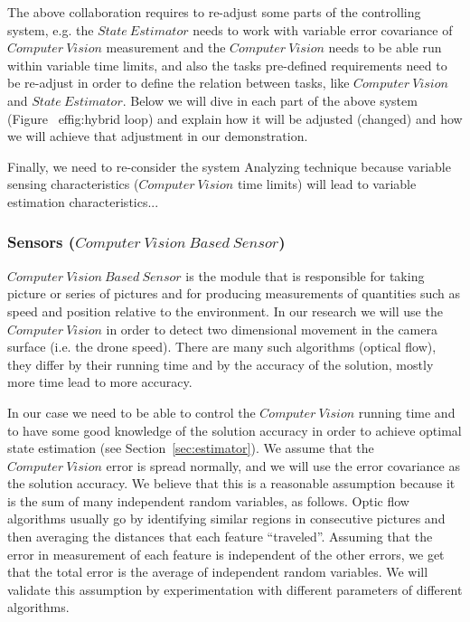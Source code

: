 \documentclass[11pt]{article}
\begin{document}
The above collaboration requires to re-adjust some parts of the controlling system, e.g. the $State~Estimator$ needs to work with variable error covariance of $Computer~Vision$ measurement and the $Computer~Vision$ needs to be able run within variable time limits, and also the tasks pre-defined requirements need to be re-adjust in order to define the relation between tasks, like $Computer~Vision$ and $State~Estimator$.
Below we will dive in each part of the above system (Figure~
ef{fig:hybrid loop}) and explain how it will be adjusted (changed) and how we will achieve that adjustment in our demonstration.

Finally, we need to re-consider the system Analyzing technique because variable sensing characteristics ($Computer~Vision$ time limits) will lead to variable estimation characteristics... %

\subsubsection{Sensors ($Computer~Vision~Based~Sensor$)}
\label{sec:sensors}

$Computer~Vision~Based~Sensor$ is the module that is responsible for taking picture or series of pictures and for producing measurements of quantities such as speed and position relative to the environment.
In our research we will use the $Computer~Vision$ in order to detect two dimensional movement in the camera surface (i.e. the drone speed).
There are many such algorithms (optical flow), they differ by their running time and by the accuracy of the solution, mostly more time lead to more accuracy.

In our case we need to be able to control the $Computer~Vision$ running time and to have some good knowledge of the solution accuracy in order to achieve optimal state estimation (see Section~\ref{sec:estimator}).
We assume that the $Computer~Vision$ error is spread normally, and we will use the error covariance as the solution accuracy. 
We believe that this is a reasonable  assumption because it is the sum of many independent random variables, as follows. Optic flow algorithms usually go by identifying similar regions in consecutive pictures and then averaging the distances that each feature ``traveled''. Assuming that the error in measurement of each feature is independent of the other errors, we get that the total error is the average of independent random variables. We will validate this assumption by experimentation with different parameters of different algorithms.
\end{document}
